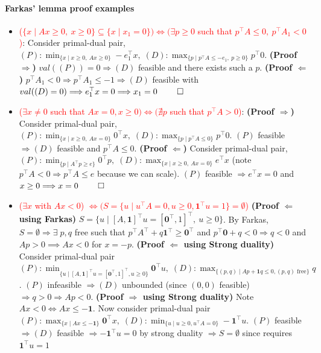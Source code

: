 \documentclass{article}
\begin{document}
\paragraph{Farkas' lemma proof examples}
\begin{itemize}
    \item \textcolor{red}{($\{x\mid Ax\geq 0,\ x\geq 0\} \subseteq \{x\mid x_1=0\}) \iff (\exists p\geq 0$ such that $p^\top A \leq 0,\ p^\top A_1 < 0$)}: Consider primal-dual pair, $(P):\min_{\{x\mid x\geq 0,\ Ax\geq 0\}}-e_1^\top x,\; (D): \max_{\{p\mid p^\top A\leq -e_1,\ p\geq 0\}}p^\top 0$. \textbf{(Proof $\Rightarrow$)} $val((P)) = 0 \Longrightarrow (D)$ feasible and there exists such a $p$. \textbf{(Proof $\Leftarrow$)} $p^\top A_1 < 0 \Rightarrow p^\top A_1 \leq -1 \Rightarrow (D)$ feasible with $val((D) = 0) \Longrightarrow e_1^\top x = 0 \Longrightarrow x_1 = 0\ \qed$

    \item \textcolor{red}{($\exists x \neq 0$ such that $Ax=0, x\geq 0) \iff (\nexists p$ such that $p^\top A > 0$)}:
    \textbf{(Proof $\Rightarrow$)} Consider primal-dual pair, $(P):\min_{\{x\mid x\geq 0,\ Ax= 0\}}0^\top x,\; (D): \max_{\{p\mid p^\top A\leq 0\}}p^\top 0$. $(P)$ feasible $\Rightarrow (D)$ feasible and $p^\top A \leq 0$. \textbf{(Proof $\Leftarrow$)} Consider primal-dual pair, $(P):\min_{\{p\mid A^\top p \geq e\}}0^\top p,\; (D): \max_{\{x \mid x\geq 0,\ Ax = 0\}}e^\top x$ (note $p^\top A < 0 \Rightarrow p^\top A \leq e$ because we can scale). $(P)$ feasible $\Longrightarrow e^\top x = 0$ and $x\geq 0 \Longrightarrow x = 0\ \qed$ 

    \item \textcolor{red}{($\exists x$ with $Ax < 0$) $\iff (S = \{u \mid u^\top A = 0, u \geq 0, \mathbf{1}^\top u = 1\} = \emptyset$)}    
    \textbf{(Proof $\Leftarrow$ using Farkas)} $S = \{u \mid [A, \mathbf{1}]^\top u = [\mathbf{0}^\top , 1]^\top ,\ u \geq 0\}$. By Farkas, $S=\emptyset\Longrightarrow \exists\;p, q$ free such that $p^\top A^\top  + q\mathbf{1}^\top  \geq \mathbf{0}^\top $ and $p^\top \mathbf{0} + q < 0 \Longrightarrow q < 0$ and $Ap > 0 \implies Ax < 0$ for $x = -p$.
    \textbf{(Proof $\Leftarrow$ using Strong duality)} Consider primal-dual pair $(P): \min_{\{u\mid  [A, \mathbf{1}]^\top u = [\mathbf{0}^\top , 1]^\top , u \geq 0\}}\mathbf{0}^\top u,\; (D): \max_{\{(p,q)\mid Ap + \mathbf{1}q \leq 0, (p,q) \text{ free}\}} q$. $(P)$ infeasible $\Longrightarrow (D)$ unbounded (since $(0,0)$ feasible) $\Longrightarrow q > 0 \Longrightarrow Ap < 0$.
    \textbf{(Proof $\Rightarrow$ using Strong duality)} Note $Ax < 0 \iff Ax \leq -\mathbf{1}$. Now consider primal-dual pair $(P): \max_{\{x\mid Ax \leq -\mathbf{1}\}}\mathbf{0}^\top x,\; (D): \min_{\{u\mid u\geq 0, u^\top A = 0\}} -\mathbf{1}^\top u$. $(P)$ feasible $\Longrightarrow (D)$ feasible $\Longrightarrow  -\mathbf{1}^\top u=0$ by strong duality $\Longrightarrow S = \emptyset$ since requires $\mathbf{1}^\top u = 1$


\end{itemize}
\end{document}
